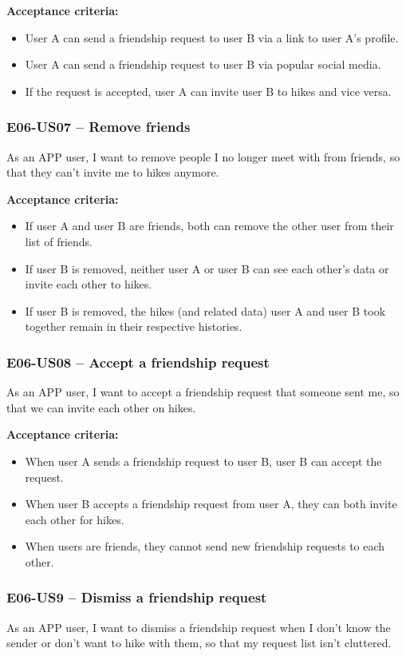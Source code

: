 \textbf{Acceptance criteria:}
\begin{itemize}
    \item User A can send a friendship request to user B via a link to user A's profile.
    \item User A can send a friendship request to user B via popular social media.
    \item If the request is accepted, user A can invite user B to hikes and vice versa.
\end{itemize}

\subsubsection*{E06-US07 -- Remove friends}
As an APP user, I want to remove people I no longer meet with from friends, so that they can't invite me to hikes anymore.

\textbf{Acceptance criteria:}
\begin{itemize}
    \item If user A and user B are friends, both can remove the other user from their list of friends.
    \item If user B is removed, neither user A or user B can see each other's data or invite each other to hikes.
    \item If user B is removed, the hikes (and related data) user A and user B took together remain in their respective histories.
\end{itemize}

\subsubsection*{E06-US08 -- Accept a friendship request}
As an APP user, I want to accept a friendship request that someone sent me, so that we can invite each other on hikes.

\textbf{Acceptance criteria:}
\begin{itemize}
    \item When user A sends a friendship request to user B, user B can accept the request.
    \item When user B accepts a friendship request from user A, they can both invite each other for hikes.
    \item When users are friends, they cannot send new friendship requests to each other.
\end{itemize}


\subsubsection*{E06-US9 -- Dismiss a friendship request}
As an APP user, I want to dismiss a friendship request when I don't know the sender or don't want to hike with them, so that my request list isn't cluttered.

